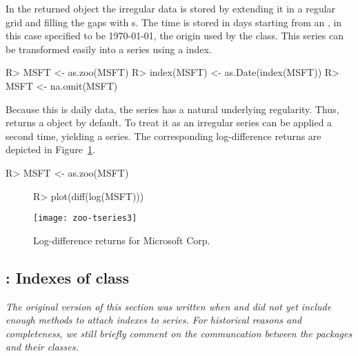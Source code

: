 \documentclass[article,nojss]{jss}
\begin{document}
In the returned  object the irregular data is stored by extending
it in a regular grid and filling the gaps with s. The time is stored
in days starting from an , in this case specified to be 1970-01-01, the
origin used by the  class.
This series can be transformed easily into a  series 
using a  index. 

\begin{Schunk}
\begin{Sinput}
R> MSFT <- as.zoo(MSFT)
R> index(MSFT) <- as.Date(index(MSFT))
R> MSFT <- na.omit(MSFT)
\end{Sinput}
\end{Schunk}

Because this is daily data, the series has a natural underlying regularity.
Thus,  returns a  object by default. To treat it
as an irregular series  can be applied a second time, yielding
a  series. The corresponding log-difference returns are
depicted in Figure~\ref{fig:tseries}.

\begin{Schunk}
\begin{Sinput}
R> MSFT <- as.zoo(MSFT)
\end{Sinput}
\end{Schunk}

\begin{figure}[h!]
\begin{center}
\begin{Schunk}
\begin{Sinput}
R> plot(diff(log(MSFT)))
\end{Sinput}
\end{Schunk}
\texttt{[image: zoo-tseries3]}
\caption{\label{fig:tseries} Log-difference returns for Microsoft Corp.}
\end{center}
\end{figure}


\subsection[fCalendar: Indexes of class "timeDate"]{: Indexes of class }
\label{sec:fCalendar}

\emph{The original version of this section was written when  and 
did not yet include enough methods to attach  indexes to 
series. For historical reasons and completeness, we still briefly comment on the communcation
between the packages and their classes.}
\end{document}
